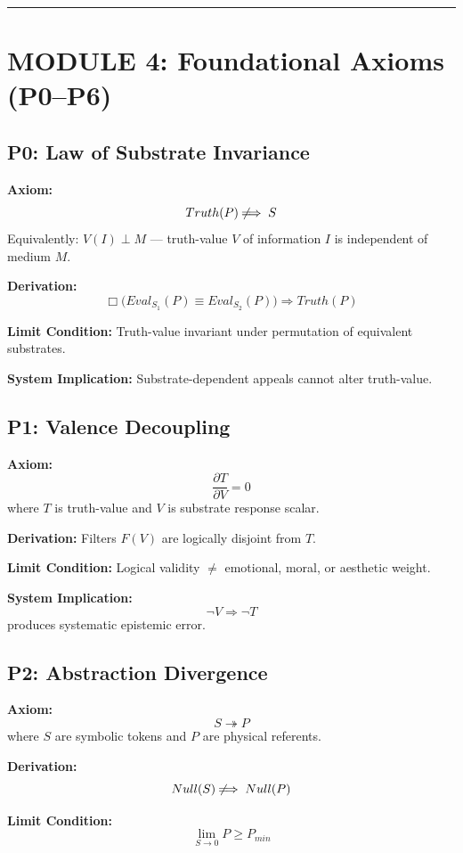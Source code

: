 \documentclass{article}
\begin{document}
\bigskip
\hrule
\bigskip

\section*{MODULE 4: Foundational Axioms (P0--P6)}

\subsection*{P0: Law of Substrate Invariance}

\textbf{Axiom:}
\[ Truth(P) \not\!\!\implies S \]
Equivalently: $V(I) \perp M$ --- truth-value $V$ of information $I$ is independent
of medium $M$.

\textbf{Derivation:}
\[ \Box\bigl(Eval_{S_1}(P) \equiv Eval_{S_2}(P)\bigr) \Rightarrow Truth(P) \]

\textbf{Limit Condition:} Truth-value invariant under permutation of equivalent
substrates.

\textbf{System Implication:} Substrate-dependent appeals cannot alter truth-value.

\bigskip

\subsection*{P1: Valence Decoupling}

\textbf{Axiom:}
\[ \frac{\partial T}{\partial V} = 0 \]
where $T$ is truth-value and $V$ is substrate response scalar.

\textbf{Derivation:} Filters $F(V)$ are logically disjoint from $T$.

\textbf{Limit Condition:} Logical validity $\neq$ emotional, moral, or aesthetic weight.

\textbf{System Implication:}
\[ \neg V \Rightarrow \neg T \]
produces systematic epistemic error.

\bigskip

\subsection*{P2: Abstraction Divergence}

\textbf{Axiom:}
\[ S \twoheadrightarrow P \]
where $S$ are symbolic tokens and $P$ are physical referents.

\textbf{Derivation:}
\[ Null(S) \not\!\!\implies Null(P) \]

\textbf{Limit Condition:}
\[ \lim_{S \to 0} P \ge P_{min} \]
\end{document}
